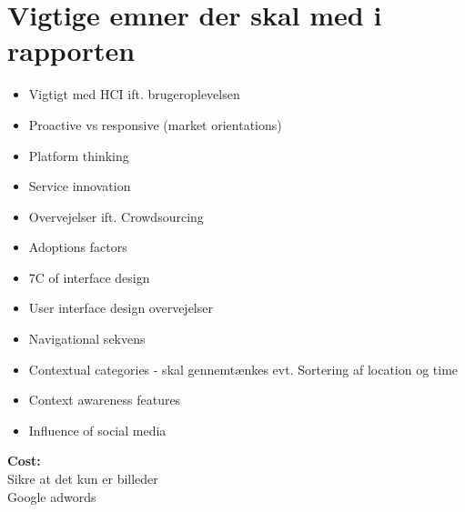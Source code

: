 \section*{Vigtige emner der skal med i rapporten}


\begin{itemize}  

\item Vigtigt med HCI ift. brugeroplevelsen

\item Proactive vs responsive (market orientations) 

\item Platform thinking

\item Service innovation

\item Overvejelser ift. Crowdsourcing 

\item Adoptions factors

\item 7C of interface design

\item User interface design overvejelser

\item Navigational sekvens

\item Contextual categories - skal gennemtænkes evt. Sortering af location og time

\item Context awareness features 

\item Influence of social media

\end{itemize}


\textbf{Cost:}\\
Sikre at det kun er billeder \\
Google adwords 